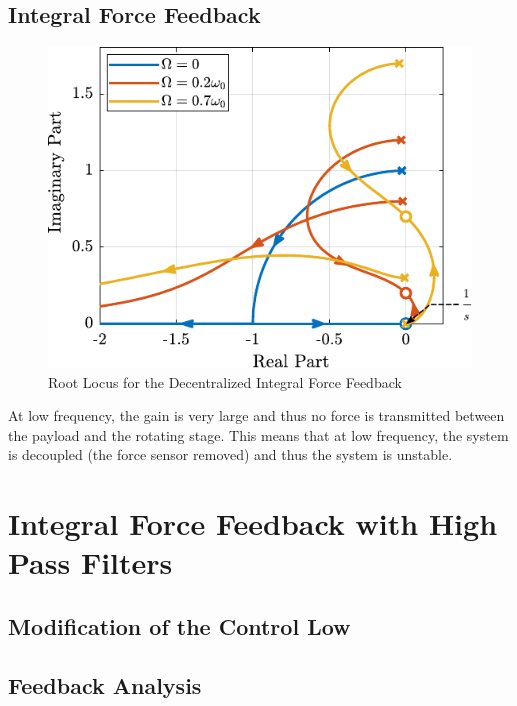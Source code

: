 \documentclass{ISMA_USD2020}
\begin{document}
\subsection{Integral Force Feedback}
\label{sec:org049877c}

\begin{figure}[htbp]
\centering
\includegraphics[scale=1]{figs/root_locus_pure_iff.pdf}
\caption{\label{fig:root_locus_pure_iff}Root Locus for the Decentralized Integral Force Feedback}
\end{figure}

At low frequency, the gain is very large and thus no force is transmitted between the payload and the rotating stage.
This means that at low frequency, the system is decoupled (the force sensor removed) and thus the system is unstable.


\section{Integral Force Feedback with High Pass Filters}
\label{sec:org54452db}
\subsection{Modification of the Control Low}
\label{sec:org325cdd4}


\subsection{Feedback Analysis}
\label{sec:org5efee77}
\end{document}
